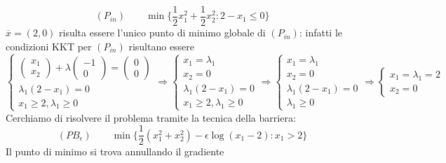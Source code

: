 \begin{example}
$$
(P_{in}) \qquad
\min\{ \dfrac{1}{2} x_1^{2} +
\dfrac{1}{2} x_2^{2}  : 2 -x_1 \leq 0  \}  $$
$\overline{x}=(2,0)$ risulta essere l'unico punto di minimo
globale di $(P_{in})$: infatti le condizioni
KKT per $(P_{in})$ risultano essere
$$
 \left\{
\begin{array}{l}
\begin{pmatrix}
  x_1 \\
 x_2
\end{pmatrix}
+ \lambda
\begin{pmatrix}
  -1 \\
 0
\end{pmatrix}
=
\begin{pmatrix}
 0 \\
 0
\end{pmatrix} \\
\lambda_1(2 - x_1) = 0 \\
 x_1 \geq 2, \lambda_1 \geq 0 
\end{array}
\right.
\Rightarrow
\left\{
  \begin{array}{l}
    x_1 = \lambda_1 \\
    x_2 = 0 \\
   \lambda_1(2-x_1) = 0 \\
   x_1 \geq 2, \lambda_1 \geq 0
  \end{array}
\right.
\Rightarrow
\left\{
  \begin{array}{l}
    x_1 = \lambda_1 \\
    x_2 = 0 \\
   \lambda_1(2-x_1) = 0 \\
    \lambda_1 \geq 0
  \end{array}
\right.
\Rightarrow
\left\{
  \begin{array}{l}
    x_1 = \lambda_1  = 2\\
    x_2 = 0 
  \end{array}
\right.
$$
Cerchiamo di risolvere il problema tramite la tecnica
della barriera:
$$ (PB_{\epsilon}) \qquad 
\min \{ \dfrac{1}{2}(x_1^{2} + x_2^{2}) - \epsilon \log(x_1 -2) :
 x_1 > 2 \}
$$
Il punto di minimo si trova annullando il gradiente


\end{example}
